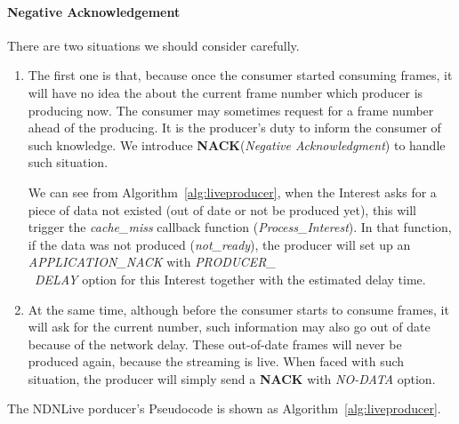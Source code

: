 \paragraph{Negative Acknowledgement} %
\label{par:negative_acknowledgement}
\vspace{0.3cm}
There are two situations we should consider carefully. 
\begin{enumerate}
	\item The first one is that, because once the consumer started consuming frames, it will have no idea the about the current frame number which producer is producing now. The consumer may sometimes request for a frame number ahead of the producing. It is the producer's duty to inform the consumer of such knowledge. We introduce \textbf{NACK}(\textit{Negative Acknowledgment}) to handle such situation. 

	We can see from Algorithm~\ref{alg:liveproducer}, when the Interest asks for a piece of data not existed (out of date or not be produced yet), this will trigger the \textit{cache\_miss} callback function (\textit{Process\_Interest}). In that function, if the data was not produced (\textit{not\_ready}), the producer will set up an \textit{APPLICATION\_NACK} with \textit{PRODUCER\_ \\\ DELAY} option for this Interest together with the estimated delay time.

	\item At the same time, although before the consumer starts to consume frames, it will ask for the current number, such information may also go out of date because of the network delay. These out-of-date frames will never be produced again, because the streaming is live. When faced with such situation, the producer will simply send a \textbf{NACK} with \textit{NO-DATA} option.
\end{enumerate}

The NDNLive porducer's Pseudocode is shown as Algorithm~\ref{alg:liveproducer}.

